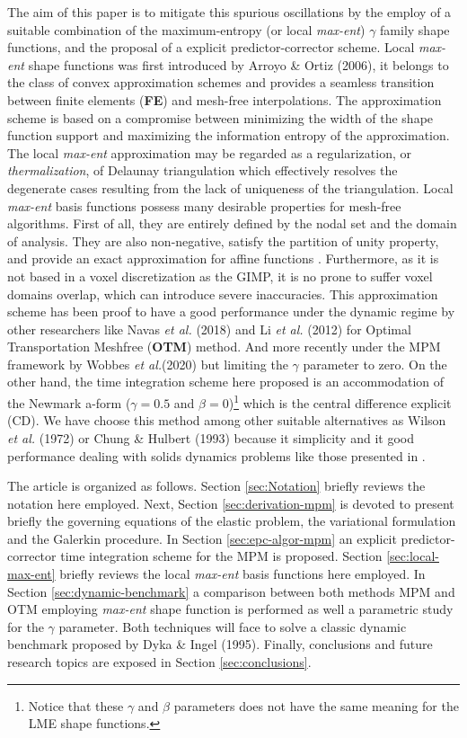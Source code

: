 The aim of this paper is to mitigate this spurious oscillations by the
employ of a suitable combination of the maximum-entropy (or local
\textit{max-ent}) $\gamma$ family shape functions, and the proposal of a explicit 
predictor-corrector scheme. Local \textit{max-ent} shape functions was
first introduced by Arroyo \& Ortiz (2006)\cite{Arroyo2006}, it belongs to the class of convex 
approximation schemes and provides a seamless transition between
finite elements (\textbf{FE}) and mesh-free interpolations. The
approximation scheme is based on a compromise between minimizing the
width of the shape function support and maximizing the information
entropy of the approximation. The local \textit{max-ent} approximation
may be regarded as a regularization, or \textit{thermalization}, of
Delaunay triangulation which effectively resolves the degenerate cases
resulting from the lack of uniqueness of the triangulation. Local
\textit{max-ent} basis functions possess many desirable properties for
mesh-free algorithms. First of all, they are entirely defined by the
nodal set and the domain of analysis. They are also non-negative,
satisfy the partition of unity property, and provide an exact
approximation for affine functions \cite{Arroyo2006}. Furthermore, as
it is not based in a voxel discretization as the GIMP, it is no prone to suffer
voxel domains overlap, which can introduce severe inaccuracies. This
approximation scheme has been proof to have a good performance under
the dynamic regime by other researchers like Navas {\it et al.}
(2018)\cite{Navas2018a} and Li {\it et al.} (2012)\cite{Li2012} for
Optimal Transportation Meshfree (\textbf{OTM}) method. And more
recently under the MPM framework by Wobbes {\it et
  al.}(2020)\cite{Wobbes2020} but limiting the $\gamma$ parameter to
zero. On the other hand, the time integration scheme here proposed is an accommodation of
the Newmark a-form ($\gamma = 0.5$ and $\beta = 0$)\footnote{Notice
that these $\gamma$ and $\beta$ parameters does not have the same
meaning for the LME shape functions.} which is the central difference
explicit (CD). We have choose this method among other suitable
alternatives as Wilson {\it et al.} (1972)\nocite{Wilson1972} or Chung
\& Hulbert (1993)\nocite{Geranlized_alpha_1993} because it simplicity
and it good performance dealing with solids dynamics problems like those
presented in \cite{Navas2018a}.

The article is organized as follows. Section \ref{sec:Notation}
briefly reviews the notation here employed. Next, Section \ref{sec:derivation-mpm}
is devoted to present briefly the governing equations of the elastic
problem, the variational formulation and the Galerkin procedure. In Section \ref{sec:epc-algor-mpm} an explicit predictor-corrector
time integration scheme for the MPM is proposed. Section
\ref{sec:local-max-ent} briefly reviews the local \textit{max-ent}
basis functions here employed. In Section \ref{sec:dynamic-benchmark}
a comparison between both methods MPM and OTM employing \textit{max-ent} shape
function is performed as well a parametric study for the $\gamma$
parameter. Both techniques will face to solve a classic dynamic
benchmark proposed by Dyka \& Ingel (1995)\cite{Dyka1995}. Finally,
conclusions and future research topics are exposed in Section \ref{sec:conclusions}.

